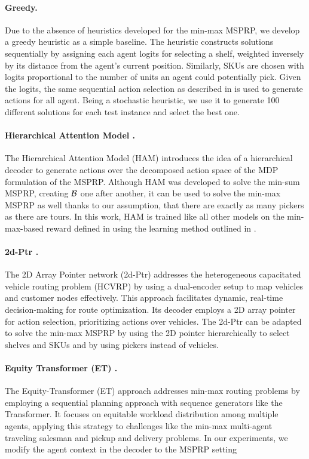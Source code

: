 \paragraph{Greedy.}
Due to the absence of heuristics developed for the min-max MSPRP, we develop a greedy heuristic as a simple baseline. The heuristic constructs solutions sequentially by assigning each agent logits for selecting a shelf, weighted inversely by its distance from the agent's current position. Similarly, SKUs are chosen with logits proportional to the number of units an agent could potentially pick. Given the logits, the same sequential action selection as described in  is used to generate actions for all agent. Being a stochastic heuristic, we use it to generate 100 different solutions for each test instance and select the best one. 


\paragraph{Hierarchical Attention Model \cite{luttmann2024neural}.}
The Hierarchical Attention Model (HAM) introduces the idea of a hierarchical decoder to generate actions over the decomposed action space of the MDP formulation of the MSPRP. Although HAM was developed to solve the min-sum MSPRP, creating $\mathcal{B}$ one after another, it can be used to solve the min-max MSPRP as well thanks to our assumption, that there are exactly as many pickers as there are tours. In this work, HAM is trained like all other models on the min-max-based reward defined in  using the learning method outlined in .


\paragraph{2d-Ptr \cite{liu20242d}.}
The 2D Array Pointer network (2d-Ptr) addresses the heterogeneous capacitated vehicle routing problem (HCVRP) by using a dual-encoder setup to map vehicles and customer nodes effectively. This approach facilitates dynamic, real-time decision-making for route optimization. Its decoder employs a 2D array pointer for action selection, prioritizing actions over vehicles. The 2d-Ptr can be adapted to solve the min-max MSPRP by using the 2D pointer hierarchically to select shelves and SKUs and by using pickers instead of vehicles.

\paragraph{Equity Transformer (ET) \cite{son2024equity}.}
The Equity-Transformer (ET) approach  \cite{son2024equity} addresses min-max routing problems by employing a sequential planning approach with sequence generators like the Transformer. It focuses on equitable workload distribution among multiple agents, applying this strategy to challenges like the min-max multi-agent traveling salesman and pickup and delivery problems. In our experiments, we modify the agent context in the decoder to the MSPRP setting


